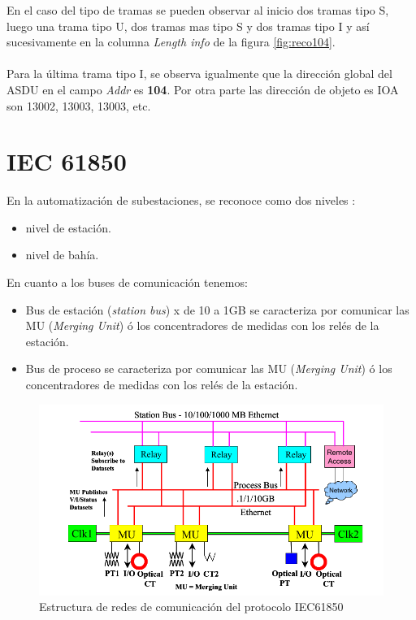 \documentclass[a5paper]{book}%
\begin{document}
En el caso del tipo de tramas se pueden observar al inicio dos tramas tipo S, luego una trama tipo U, dos tramas mas tipo S y dos tramas tipo I y así sucesivamente en la columna \textit{Length info} de la figura \ref{fig:reco104}.\\\\

Para la última trama tipo I, se observa igualmente que la dirección global del ASDU en el campo \textit{Addr} es \textbf{104}. Por otra parte las dirección de objeto es IOA son 13002, 13003, 13003, etc.


\section{IEC 61850}

En la automatización de subestaciones, se reconoce como dos niveles :

\begin{itemize}
\item nivel de estación.
\item nivel de bahía.
\end{itemize}

En cuanto a los buses de comunicación tenemos:

\begin{itemize}
	\item Bus de estación (\textit{station bus}) x de 10 a 1GB se caracteriza por comunicar las MU (\textit{Merging Unit}) ó los concentradores de medidas con los relés de la estación.
    \item Bus de proceso se caracteriza por comunicar las MU (\textit{Merging Unit}) ó los concentradores de medidas con los relés de la estación.
\end{itemize}

\begin{figure}[H]
  \centering
  
  \caption{Estructura de redes de comunicación del protocolo IEC61850}
  \label{fig:iec61850}
  \includegraphics[width=\linewidth]{iec61850}
\end{figure}
\end{document}
